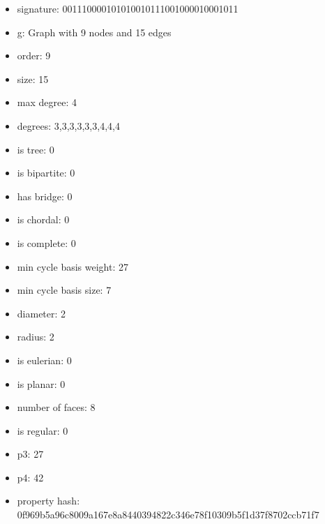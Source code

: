 \begin{figure}
\end{figure}
\begin{itemize}
\item signature: 001110000101010010111001000010001011
\item g: Graph with 9 nodes and 15 edges
\item order: 9
\item size: 15
\item max degree: 4
\item degrees: 3,3,3,3,3,3,4,4,4
\item is tree: 0
\item is bipartite: 0
\item has bridge: 0
\item is chordal: 0
\item is complete: 0
\item min cycle basis weight: 27
\item min cycle basis size: 7
\item diameter: 2
\item radius: 2
\item is eulerian: 0
\item is planar: 0
\item number of faces: 8
\item is regular: 0
\item p3: 27
\item p4: 42
\item property hash: 0f969b5a96c8009a167e8a8440394822c346e78f10309b5f1d37f8702ccb71f7
\end{itemize}
\newpage
